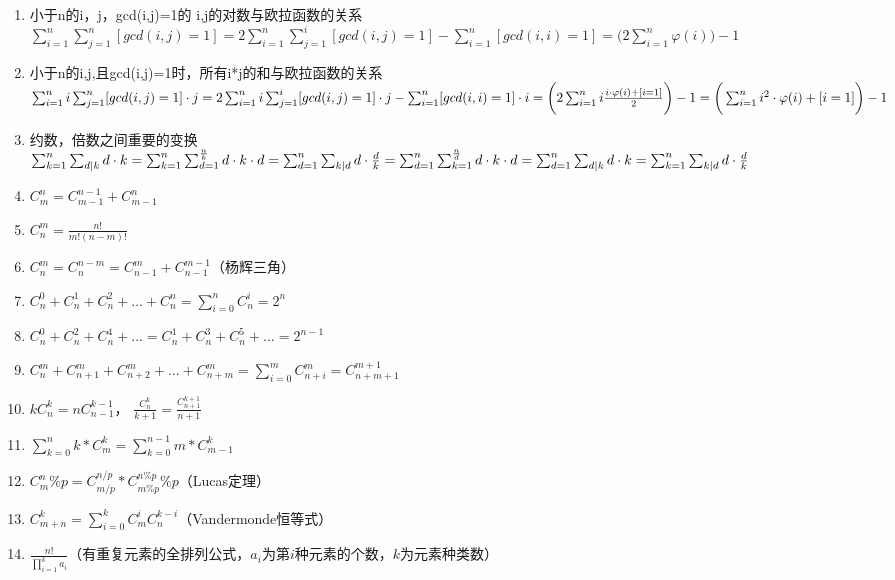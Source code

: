 \begin{enumerate}
\item 小于n的i，j，gcd(i,j)=1的 i,j的对数与欧拉函数的关系 $\sum_{i=1}^n\sum_{j=1}^n[gcd(i,j)=1]=2\sum_{i=1}^n\sum_{j=1}^i[gcd(i,j)=1]-\sum_{i=1}^n[gcd(i,i)=1]=\big(2\sum_{i=1}^n\varphi(i)\big)-1$

\item 小于n的i,j,且gcd(i,j)=1时，所有i*j的和与欧拉函数的关系 $\sum_{i=1}^{n}i\sum_{j=1}^{n}[gcd(i,j)=1]\cdot j=2\sum_{i=1}^{n}i\sum_{j=1}^i[gcd(i,j)=1]\cdot j-\sum_{i=1}^n[gcd(i,i)=1]\cdot i\\
=\bigg(2\sum_{i=1}^ni\frac{i\cdot\varphi(i)+[i=1]}{2}\bigg)-1=\bigg(\sum_{i=1}^ni^2\cdot\varphi(i)+[i=1]\bigg)-1$

\item 约数，倍数之间重要的变换 $
\sum_{k=1}^n\sum_{d|k}d\cdot k=\sum_{k=1}^n\sum_{d=1}^{\frac nk}d\cdot k\cdot d=\sum_{d=1}^n\sum_{k|d}d\cdot \frac dk=\sum_{d=1}^n\sum_{k=1}^{\frac nd}d\cdot k\cdot d=\sum_{d=1}^n\sum_{d|k}d\cdot k=\sum_{k=1}^n\sum_{k|d} d\cdot\frac dk\\$

\item $C_m^n=C_{m-1}^{n-1}+C_{m-1}^n$
\item $C_n^m = \frac{n!}{m!(n-m)!}$ 
\item $C_n^m = C_n^{n-m} = C^{m}_{n-1} + C^{m-1}_{n-1}$（杨辉三角）
\item $C_n^0+C_n^1+C_n^2+...+C_n^n = \sum_{i=0}^{n}{C_n^i} = 2^n$
\item $C_n^0+C_n^2+C_n^4+... = C_n^1+C_n^3+C_n^5+... = 2^{n-1}$
\item $C_n^m+C_{n+1}^m+C_{n+2}^m+...+C_{n+m}^m = \sum_{i=0}^{m}C_{n+i}^{m} = C_{n+m+1}^{m+1}$
\item $k C_n^k = nC_{n-1}^{k-1}$， $\frac{C_n^k}{k+1} = \frac{C_{n+1}^{k+1}}{n+1}$
\item $\sum\limits_{k=0}^nk*C_m^k=\sum\limits_{k=0}^{n-1}m*C_{m-1}^k$
\item $C_m^n\%p=C_{m/p}^{n/p}*C_{m\%p}^{n\%p}\%p$（Lucas定理）
\item $C_{m+n}^k=\sum\limits_{i=0}^kC_m^iC_n^{k-i}$（Vandermonde恒等式）
\item $\frac{n!}{\prod\limits^k_{i=1}a_i}$（有重复元素的全排列公式，$a_i$为第$i$种元素的个数，$k$为元素种类数）
\end{enumerate}